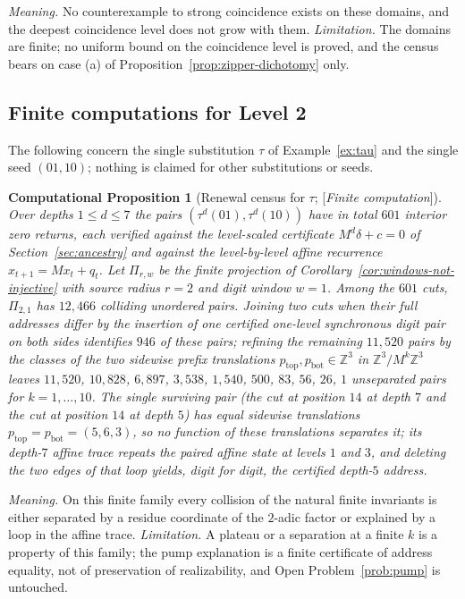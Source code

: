 \documentclass[11pt]{amsart}
\theoremstyle{plain}
\newtheorem{computation}[theorem]{Computational Proposition}
\theoremstyle{definition}
\theoremstyle{remark}
\newcommand{\Z}{\mathbb{Z}}
\newcommand{\Status}[1]{\textup{[\textit{#1}]}}
\begin{document}
\emph{Meaning.} No counterexample to strong coincidence exists on these domains, and the deepest coincidence level does not grow with them. \emph{Limitation.} The domains are finite; no uniform bound on the coincidence level is proved, and the census bears on case (a) of Proposition~\ref{prop:zipper-dichotomy} only.

\subsection{Finite computations for Level 2}\label{sec:finite-level2}

The following concern the single substitution $\tau$ of Example~\ref{ex:tau} and the single seed $(01,10)$; nothing is claimed for other substitutions or seeds.

\begin{computation}[Renewal census for $\tau$; \Status{Finite computation}]\label{comp:renewal}
Over depths $1\le d\le7$ the pairs $(\tau^d(01),\tau^d(10))$ have in total $601$ interior zero returns, each verified against the level-scaled certificate $M^d\delta+c=0$ of Section~\ref{sec:ancestry} and against the level-by-level affine recurrence $x_{t+1}=Mx_t+q_t$. Let $\Pi_{r,w}$ be the finite projection of Corollary~\ref{cor:windows-not-injective} with source radius $r=2$ and digit window $w=1$. Among the $601$ cuts, $\Pi_{2,1}$ has $12{,}466$ colliding unordered pairs. Joining two cuts when their full addresses differ by the insertion of one certified one-level synchronous digit pair on both sides identifies $946$ of these pairs; refining the remaining $11{,}520$ pairs by the classes of the two sidewise prefix translations $p_{\mathrm{top}},p_{\mathrm{bot}}\in\Z^3$ in $\Z^3/M^k\Z^3$ leaves $11{,}520$, $10{,}828$, $6{,}897$, $3{,}538$, $1{,}540$, $500$, $83$, $56$, $26$, $1$ unseparated pairs for $k=1,\dots,10$. The single surviving pair (the cut at position $14$ at depth $7$ and the cut at position $14$ at depth $5$) has \emph{equal} sidewise translations $p_{\mathrm{top}}=p_{\mathrm{bot}}=(5,6,3)$, so no function of these translations separates it; its depth-$7$ affine trace repeats the paired affine state at levels $1$ and $3$, and deleting the two edges of that loop yields, digit for digit, the certified depth-$5$ address.
\end{computation}

\emph{Meaning.} On this finite family every collision of the natural finite invariants is either separated by a residue coordinate of the $2$-adic factor or explained by a loop in the affine trace. \emph{Limitation.} A plateau or a separation at a finite $k$ is a property of this family; the pump explanation is a finite certificate of address equality, not of preservation of realizability, and Open Problem~\ref{prob:pump} is untouched.
\end{document}

